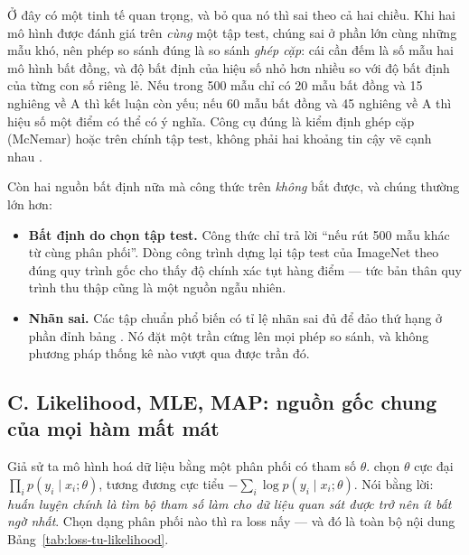 \documentclass[../../../deep_learning.tex]{subfiles}
\begin{document}
Ở đây có một tinh tế quan trọng, và bỏ qua nó thì sai theo cả hai chiều. Khi hai mô hình được đánh giá trên \emph{cùng} một tập test, chúng sai ở phần lớn cùng những mẫu khó, nên phép so sánh đúng là so sánh \emph{ghép cặp}: cái cần đếm là số mẫu hai mô hình bất đồng, và độ bất định của hiệu số nhỏ hơn nhiều so với độ bất định của từng con số riêng lẻ. Nếu trong 500 mẫu chỉ có 20 mẫu bất đồng và 15 nghiêng về A thì kết luận còn yếu; nếu 60 mẫu bất đồng và 45 nghiêng về A thì hiệu số một điểm có thể có ý nghĩa. Công cụ đúng là kiểm định ghép cặp (McNemar) hoặc  trên chính tập test, không phải hai khoảng tin cậy vẽ cạnh nhau \cite{demsar2006statistical}.

Còn hai nguồn bất định nữa mà công thức trên \emph{không} bắt được, và chúng thường lớn hơn:

\begin{itemize}
\item \textbf{Bất định do chọn tập test.} Công thức chỉ trả lời ``nếu rút 500 mẫu khác từ cùng phân phối''. Dòng công trình dựng lại tập test của ImageNet theo đúng quy trình gốc cho thấy độ chính xác tụt hàng điểm \cite{recht2019imagenet} --- tức bản thân quy trình thu thập cũng là một nguồn ngẫu nhiên.
\item \textbf{Nhãn sai.} Các tập chuẩn phổ biến có tỉ lệ nhãn sai đủ để đảo thứ hạng ở phần đỉnh bảng \cite{northcutt2021pervasive}. Nó đặt một trần cứng lên mọi phép so sánh, và không phương pháp thống kê nào vượt qua được trần đó.
\end{itemize}

\subsection{C. Likelihood, MLE, MAP: nguồn gốc chung của mọi hàm mất mát}
Giả sử ta mô hình hoá dữ liệu bằng một phân phối có tham số \(\theta\).  chọn \(\theta\) cực đại \(\prod_i p(y_i\mid x_i;\theta)\), tương đương cực tiểu \(-\sum_i \log p(y_i\mid x_i;\theta)\). Nói bằng lời: \emph{huấn luyện chính là tìm bộ tham số làm cho dữ liệu quan sát được trở nên ít bất ngờ nhất}. Chọn dạng phân phối nào thì ra loss nấy --- và đó là toàn bộ nội dung Bảng~\ref{tab:loss-tu-likelihood}.
\end{document}
